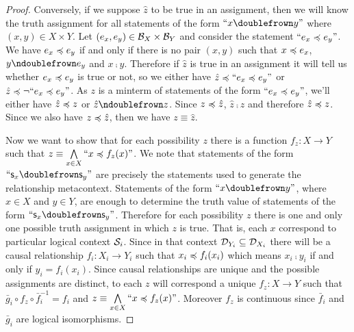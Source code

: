 \begin{mathSection}
\begin{proof}
		Conversely, if we suppose $\hat{z}$ to be true in an assignment, then we will know the truth assignment for all statements of the form $``x \comp y"$ where $(x,y) \in X \times Y$. Let $(e_x, e_y) \in \mathcal{B}_X \times \mathcal{B}_Y$ and consider the statement $``e_x \preccurlyeq e_y"$. We have $e_x \preccurlyeq e_y$ if and only if there is no pair $(x,y)$ such that $x \preccurlyeq e_x$, $y \ncomp e_y$ and $x \comp y$. Therefore if $\hat{z}$ is true in an assignment it will tell us whether $e_x \preccurlyeq e_y$ is true or not, so we either have $\hat{z} \preccurlyeq ``e_x \preccurlyeq e_y"$ or $\hat{z} \preccurlyeq \neg ``e_x \preccurlyeq e_y"$. As $z$ is a minterm of statements of the form $``e_x \preccurlyeq e_y"$, we'll either have $\hat{z} \preccurlyeq z$ or $\hat{z} \ncomp z$. Since $z \preccurlyeq \hat{z}$,  $\hat{z} \comp z$ and therefore $\hat{z} \preccurlyeq z$. Since we also have $z \preccurlyeq \hat{z}$, then we have $z \equiv \hat{z}$.
		
		Now we want to show that for each possibility $z$ there is a function $f_z : X \to Y$ such that $z\equiv\bigwedge\limits_{x\in X} ``x \preccurlyeq f_z(x)"$. We note that statements of the form $``\stmt_x \comp \stmt_y"$ are precisely the statements used to generate the relationship metacontext. Statements of the form $``x \comp y"$, where $x \in X$ and $y \in Y$, are enough to determine the truth value of statements of the form $``\stmt_x \comp \stmt_y"$. Therefore for each possibility $z$ there is one and only one possible truth assignment in which $z$ is true. That is, each $x$ correspond to particular logical context $\mathcal{S}_i$. Since in that context $\mathcal{D}_{Y_i} \subseteq \mathcal{D}_{X_i}$ there will be a causal relationship $f_i : X_i \to Y_i$ such that $x_i \preccurlyeq f_i (x_i)$ which means $x_i \comp y_i$ if and only if $y_i = f_i(x_i)$. Since causal relationships are unique and the possible assignments are distinct, to each $z$ will correspond a unique $f_z : X \to Y$ such that $\bar{g}_i \circ f_z \circ \bar{f}^{-1}_i = f_i$ and $z\equiv\bigwedge\limits_{x\in X} ``x \preccurlyeq f_z(x)"$. Moreover $f_z$ is continuous since $\bar{f}_i$ and $\bar{g}_i$ are logical isomorphisms.
	\end{proof}
\end{mathSection}

